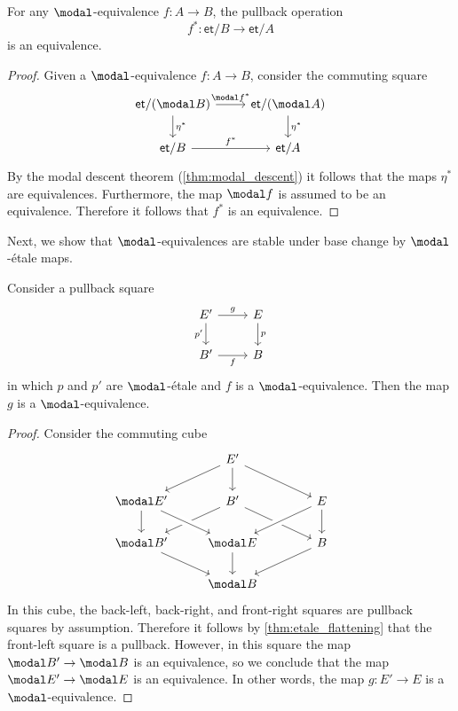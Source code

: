 \documentclass{msc}
\newcommand{\et}{\mathsf{et}}
\begin{document}
\begin{thm}
  For any $\modal$-equivalence $f:A\to B$, the pullback operation
  \begin{equation*}
    f^\ast : \et/B\to\et/A
  \end{equation*}
  is an equivalence.
\end{thm}

\begin{proof}
  Given a $\modal$-equivalence $f:A\to B$, consider the commuting square
  \begin{equation*}
    \begin{tikzcd}
      \et/(\modal B) \arrow[r,"\modal f^\ast"] \arrow[d,"\eta^\ast"] & \et/(\modal A) \arrow[d,"\eta^\ast"] \\
      \et/B \arrow[r,"f^\ast"] & \et/A
    \end{tikzcd}
  \end{equation*}
  By the modal descent theorem (\cref{thm:modal_descent}) it follows that the maps $\eta^\ast$ are equivalences. Furthermore, the map $\modal f$ is assumed to be an equivalence. Therefore it follows that $f^\ast$ is an equivalence.
\end{proof}

Next, we show that $\modal$-equivalences are stable under base change by $\modal$-\'etale maps.

\begin{prp}\label{prop:LR-cartesian-converse}
  Consider a pullback square
  \begin{equation*}
    \begin{tikzcd}
      E' \arrow[d,swap,"{p'}"] \arrow[r,"g"] & E \arrow[d,"p"] \\
      B' \arrow[r,swap,"f"] & B
    \end{tikzcd}
  \end{equation*}
  in which $p$ and $p'$ are $\modal$-\'etale and $f$ is a $\modal$-equivalence. Then the map $g$ is a $\modal$-equivalence.
\end{prp}

\begin{proof}
  Consider the commuting cube
  \begin{equation*}
    \begin{tikzcd}
      \phantom{\modal B} & E' \arrow[dl] \arrow[d] \arrow[dr] & \phantom{\modal B} \\
      \modal E' \arrow[d] & B' \arrow[dl] \arrow[dr] & E \arrow[d] \arrow[dl,crossing over] \\
      \modal B' \arrow[dr] & \modal E \arrow[from=ul,crossing over] \arrow[d] & B \arrow[dl] \\
      & \modal B
    \end{tikzcd}
  \end{equation*}
  In this cube, the back-left, back-right, and front-right squares are pullback squares by assumption. Therefore it follows by \cref{thm:etale_flattening} that the front-left square is a pullback. However, in this square the map $\modal B'\to \modal B$ is an equivalence, so we conclude that the map $\modal E'\to \modal E$ is an equivalence. In other words, the map $g:E'\to E$ is a $\modal$-equivalence.
\end{proof}
\end{document}

